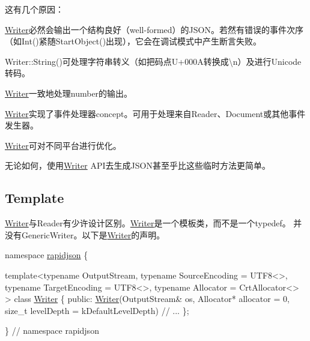 这有几个原因：
\begin{DoxyEnumerate}
\item {\ttfamily \hyperlink{class_writer}{Writer}}必然会输出一个结构良好（well-\/formed）的\+J\+S\+O\+N。若然有错误的事件次序（如{\ttfamily Int()}紧随{\ttfamily Start\+Object()}出现），它会在调试模式中产生断言失败。
\item {\ttfamily Writer\+::\+String()}可处理字符串转义（如把码点{\ttfamily U+000A}转换成{\ttfamily \textbackslash{}n}）及进行\+Unicode转码。
\item {\ttfamily \hyperlink{class_writer}{Writer}}一致地处理number的输出。
\item {\ttfamily \hyperlink{class_writer}{Writer}}实现了事件处理器concept。可用于处理来自{\ttfamily Reader}、{\ttfamily Document}或其他事件发生器。
\item {\ttfamily \hyperlink{class_writer}{Writer}}可对不同平台进行优化。
\end{DoxyEnumerate}

无论如何，使用{\ttfamily \hyperlink{class_writer}{Writer}} A\+P\+I去生成\+J\+S\+O\+N甚至乎比这些临时方法更简单。\hypertarget{md_Commun_Externe_RapidJSON_doc_sax.zh-cn_WriterTemplate}{}\subsection{Template}\label{md_Commun_Externe_RapidJSON_doc_sax.zh-cn_WriterTemplate}
{\ttfamily \hyperlink{class_writer}{Writer}}与{\ttfamily Reader}有少许设计区别。{\ttfamily \hyperlink{class_writer}{Writer}}是一个模板类，而不是一个typedef。 并没有{\ttfamily Generic\+Writer}。以下是{\ttfamily \hyperlink{class_writer}{Writer}}的声明。


\begin{DoxyCode}
\textcolor{keyword}{namespace }\hyperlink{namespacerapidjson}{rapidjson} \{

\textcolor{keyword}{template}<\textcolor{keyword}{typename} OutputStream, \textcolor{keyword}{typename} SourceEncoding = UTF8<>, \textcolor{keyword}{typename} TargetEncoding = UTF8<>, \textcolor{keyword}{
      typename} Allocator = CrtAllocator<> >
\textcolor{keyword}{class }\hyperlink{class_writer}{Writer} \{
\textcolor{keyword}{public}:
    \hyperlink{class_writer}{Writer}(OutputStream& os, Allocator* allocator = 0, \textcolor{keywordtype}{size\_t} levelDepth = kDefaultLevelDepth)
\textcolor{comment}{// ...}
\};

\} \textcolor{comment}{// namespace rapidjson}
\end{DoxyCode}


